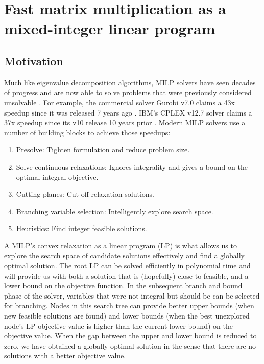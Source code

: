 \documentclass{article}
\begin{document}
\section{Fast matrix multiplication as a mixed-integer linear program}

\subsection{Motivation}

Much like eigenvalue decomposition algorithms, MILP solvers have seen decades of progress and are now able to solve problems that were previously considered unsolvable \cite{Linderoth2017}. For example, the commercial solver Gurobi v7.0 claims a 43x speedup since it was released 7 years ago \cite{GurobiBench7}. IBM's CPLEX v12.7 solver claims a 37x speedup since its v10 release 10 years prior \cite{CPLEXBench127}. Modern MILP solvers use a number of building blocks to achieve those speedups:

\begin{enumerate}
\item Presolve: Tighten formulation and reduce problem size.
\item Solve continuous relaxations: Ignores integrality and gives a bound on the optimal integral objective.
\item Cutting planes: Cut off relaxation solutions.
\item Branching variable selection: Intelligently explore search space.
\item Heuristics: Find integer feasible solutions.
\end{enumerate}

A MILP's convex relaxation as a linear program (LP) is what allows us to explore the search space of candidate solutions effectively and find a globally optimal solution. The root LP can be solved efficiently in polynomial time and will provide us with both a solution that is (hopefully) close to feasible, and a lower bound on the objective function. In the subsequent branch and bound phase of the solver, variables that were not integral but should be can be selected for branching. Nodes in this search tree can provide better upper bounds (when new feasible solutions are found) and lower bounds (when the best unexplored node's LP objective value is higher than the current lower bound) on the objective value. When the gap between the upper and lower bound is reduced to zero, we have obtained a globally optimal solution in the sense that there are no solutions with a better objective value.
\end{document}

